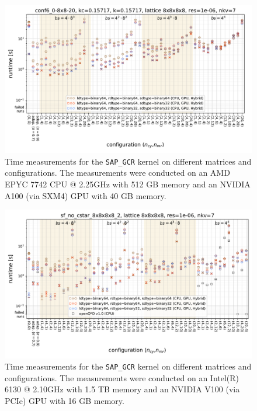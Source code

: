 \documentclass{article}
\theoremstyle{plain} %
\theoremstyle{convention} %
\theoremstyle{remark} %
\def\code#1{\texttt{#1}}
\numberwithin{equation}{section}
\begin{document}
\begin{figure}[h]
    \centering
    \includegraphics[width=1.0\textwidth]{plots/sap_gcr_conf6_0-8x8-20_kc=0.15717_k=0.15717_lattice_8x8x8x8_res=1e-06_nkv=7}
    \caption{Time measurements for the \code{SAP\_GCR} kernel on different matrices and configurations. The measurements were conducted on an AMD EPYC 7742 CPU @ 2.25GHz with 512 GB memory and an NVIDIA A100 (via SXM4) GPU with 40 GB memory.}
    \label{fig:sap_gcr1}
    \label{fig:sap_gcr_conf6_0-8x8-20_0.15717}
\end{figure}

\begin{figure}[h]
    \centering
    \includegraphics[width=1.0\textwidth]{plots/sap_gcr_sf_no_cstar_8x8x8x8_2_lattice_8x8x8x8_res=1e-06_nkv=7}
    \caption{Time measurements for the \code{SAP\_GCR} kernel on different matrices and configurations. The measurements were conducted on an Intel(R) 6130 @ 2.10GHz with 1.5 TB memory and an NVIDIA V100 (via PCIe) GPU with 16 GB memory.}
    \label{fig:sap_gcr4}
    \label{fig:sap_gcr_end}
    \label{fig:sap_gcr_sf_8x8x8x8_2}
\end{figure}
\end{document}
